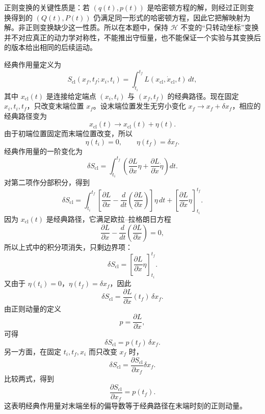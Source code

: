 \begin{solution}[非正则变换]
正则变换的关键性质是：若 $(q(t),p(t))$ 是哈密顿方程的解，则经过正则变换得到的 $(Q(t),P(t))$ 仍满足同一形式的哈密顿方程，因此它把解映射为解。非正则变换缺少这一性质。所以在本题中，保持 $\mathcal H$ 不变的“只转动坐标”变换并不对应真正的动力学对称性，不能推出守恒量，也不能保证一个实验与其变换后的版本给出相同的后续运动。
\end{solution}


\begin{solution}[经典路径的作用量]
\answer
经典作用量定义为
\[
S_{\mathrm{cl}}(x_f,t_f;x_i,t_i)=\int_{t_i}^{t_f}L(x_{\mathrm{cl}},\dot x_{\mathrm{cl}},t)\,dt,
\]
其中 $x_{\mathrm{cl}}(t)$ 是连接给定端点 $(x_i,t_i)$ 与 $(x_f,t_f)$ 的经典路径。现在固定 $x_i,t_i,t_f$，只改变末端位置 $x_f$。设末端位置发生无穷小变化 $x_f\to x_f+\delta x_f$，相应的经典路径变为
\[
x_{\mathrm{cl}}(t)\to x_{\mathrm{cl}}(t)+\eta(t).
\]
由于初端位置固定而末端位置改变，所以
\[
\eta(t_i)=0,\qquad \eta(t_f)=\delta x_f.
\]
经典作用量的一阶变化为
\[
\delta S_{\mathrm{cl}}
=\int_{t_i}^{t_f}\left(\frac{\partial L}{\partial x}\eta+\frac{\partial L}{\partial \dot x}\dot\eta\right)dt.
\]
对第二项作分部积分，得到
\[
\delta S_{\mathrm{cl}}
=\int_{t_i}^{t_f}\left[\frac{\partial L}{\partial x}-\frac{d}{dt}\left(\frac{\partial L}{\partial \dot x}\right)\right]\eta\,dt
+\left[\frac{\partial L}{\partial \dot x}\eta\right]_{t_i}^{t_f}.
\]
因为 $x_{\mathrm{cl}}(t)$ 是经典路径，它满足欧拉--拉格朗日方程
\[
\frac{\partial L}{\partial x}-\frac{d}{dt}\left(\frac{\partial L}{\partial \dot x}\right)=0,
\]
所以上式中的积分项消失，只剩边界项：
\[
\delta S_{\mathrm{cl}}=\left[\frac{\partial L}{\partial \dot x}\eta\right]_{t_i}^{t_f}.
\]
又由于 $\eta(t_i)=0$，$\eta(t_f)=\delta x_f$，因此
\[
\delta S_{\mathrm{cl}}
=\frac{\partial L}{\partial \dot x}(t_f)\,\delta x_f.
\]
由正则动量的定义
\[
p=\frac{\partial L}{\partial \dot x},
\]
可得
\[
\delta S_{\mathrm{cl}}=p(t_f)\,\delta x_f.
\]
另一方面，在固定 $t_i,t_f,x_i$ 而只改变 $x_f$ 时，
\[
\delta S_{\mathrm{cl}}=\frac{\partial S_{\mathrm{cl}}}{\partial x_f}\delta x_f.
\]
比较两式，得到
\[
\frac{\partial S_{\mathrm{cl}}}{\partial x_f}=p(t_f).
\]
这表明经典作用量对末端坐标的偏导数等于经典路径在末端时刻的正则动量。
\end{solution}




